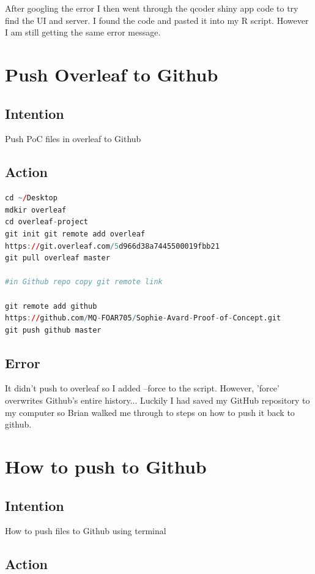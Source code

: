 \documentclass{article}
\begin{document}
After googling the error I then went through the qcoder shiny app code to try find the UI and server. I found the code and pasted it into my R script. However I am still getting the same error message. 

\section{Push Overleaf to Github}

\subsection{Intention}
Push PoC files in overleaf to Github 

\subsection{Action}
\begin{lstlisting}[language=R]
cd ~/Desktop
mdkir overleaf 
cd overleaf-project 
git init git remote add overleaf
https://git.overleaf.com/5d966d38a7445500019fbb21
git pull overleaf master 

#in Github repo copy git remote link 

git remote add github
https://github.com/MQ-FOAR705/Sophie-Avard-Proof-of-Concept.git
git push github master 

\end{lstlisting}

\subsection{Error}
It didn't push to overleaf so I added --force to the script. However, 'force' overwrites Github's entire history... Luckily I had saved my GitHub repository to my computer so Brian walked me through to steps on how to push it back to github. 

\section{How to push to Github}
\subsection{Intention}
How to push files to Github using terminal 

\subsection{Action}
\end{document}
